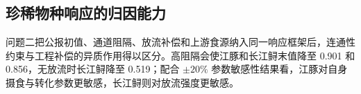 \subsection{珍稀物种响应的归因能力}
问题二把公报初值、通道阻隔、放流补偿和上游食源纳入同一响应框架后，连通性约束与工程补偿的异质作用得以区分。高阻隔会使江豚和长江鲟末值降至 0.901 和 0.856，无放流时长江鲟降至 0.519；配合 $\pm 20\%$ 参数敏感性结果看，江豚对自身摄食与转化参数更敏感，长江鲟则对放流强度更敏感。
